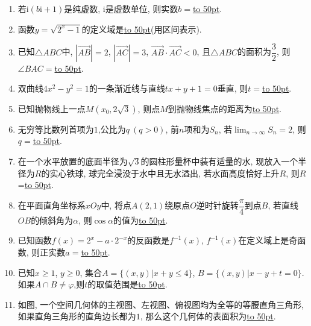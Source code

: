 \documentclass[10pt,a4paper]{article}
\newcommand{\blank}[1]{\underline{\hbox to #1pt{}}}
\begin{document}
\begin{enumerate}[1.]
\item 若$\mathrm{i}(b\mathrm{i}+1)$是纯虚数, $\mathrm{i}$是虚数单位, 则实数$b=$\blank{50}.
\item 函数$y=\sqrt{2^x-1}$的定义域是\blank{50}(用区间表示).
\item 已知$\triangle ABC$中, $|\overrightarrow{AB}|=2 $,  $|\overrightarrow{AC}|=3 $, $\overrightarrow{AB}\cdot \overrightarrow{AC}<0$, 且$\triangle ABC$的面积为$\dfrac32$, 则$\angle BAC=$\blank{50}.
\item 双曲线$4 x^2-y^2=1$的一条渐近线与直线$tx+y+1=0$垂直, 则$t=$\blank{50}.
\item 已知抛物线上一点$M(x_0,2 \sqrt3)$, 则点$M$到抛物线焦点的距离为\blank{50}.
\item 无穷等比数列首项为$1$,公比为$q \ (q>0)$, 前$n$项和为$S_n$, 若$\displaystyle\lim_{n\to\infty}S_n=2$, 则$q=$\blank{50}.
\item 在一个水平放置的底面半径为$\sqrt 3$的圆柱形量杯中装有适量的水, 现放入一个半径为$R$的实心铁球, 球完全浸没于水中且无水溢出, 若水面高度恰好上升$R$, 则$R$=\blank{50}.
\item 在平面直角坐标系$xOy$中, 将点$A(2,1)$绕原点$O$逆时针旋转$\dfrac\pi 4$到点$B$, 若直线$OB$的倾斜角为$\alpha$, 则$\cos \alpha$的值为\blank{50}.
\item 已知函数$f(x)=2^x-a\cdot 2^{-x}$的反函数是$f^{-1}(x)$, $f^{-1}(x)$在定义域上是奇函数, 则正实数$a=$\blank{50}.
\item 已知$x\ge 1$, $y\ge 0$, 集合$A=\{(x,y)|x+y\le 4\}$, $B=\{(x,y)|x-y+t=0\}$. 如果$A\cap B\ne \varphi$,则$t$的取值范围是\blank{50}.
\item 如图, 一个空间几何体的主视图、左视图、俯视图均为全等的等腰直角三角形, 如果直角三角形的直角边长都为$1$, 那么这个几何体的表面积为\blank{50}.
\begin{center}
\end{center}



\end{enumerate}
\end{document}
